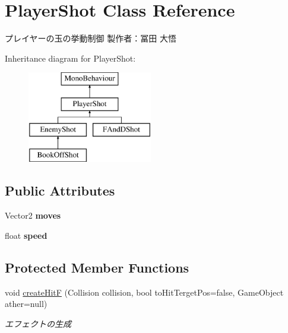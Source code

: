 \hypertarget{class_player_shot}{}\section{Player\+Shot Class Reference}
\label{class_player_shot}


プレイヤーの玉の挙動制御 製作者：冨田 大悟  


Inheritance diagram for Player\+Shot\+:\begin{figure}[H]
\begin{center}
\leavevmode
\includegraphics[height=4.000000cm]{class_player_shot}
\end{center}
\end{figure}
\subsection*{Public Attributes}
\begin{DoxyCompactItemize}
\item 
\mbox{\label{class_player_shot_a13efe1201ef3958f3da100f6c0b68c6f}} 
Vector2 {\bfseries moves}
\item 
\mbox{\label{class_player_shot_a719740e5dcacbe564dad40b471a0b5c6}} 
float {\bfseries speed}
\end{DoxyCompactItemize}
\subsection*{Protected Member Functions}
\begin{DoxyCompactItemize}
\item 
void \hyperlink{class_player_shot_ab96887c0aa85a6977007c3465d737a13}{create\+HitF} (Collision collision, bool to\+Hit\+Terget\+Pos=false, Game\+Object ather=null)
\begin{DoxyCompactList}\small\item\em エフェクトの生成 \end{DoxyCompactList}\end{DoxyCompactItemize}
